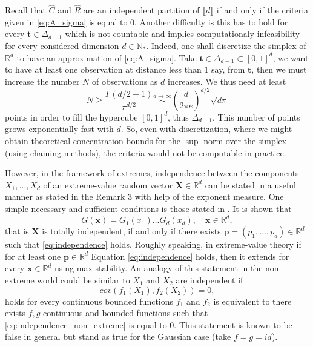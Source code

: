 \documentclass[11pt]{article}
\theoremstyle{definition}
\begin{document}
	Recall that $\hat{C}$ and $\hat{R}$ are an independent partition of $\llbracket d \rrbracket$ if and only if the criteria given in \eqref{eq:A_sigma} is equal to $0$. Another difficulty is this has to hold for every $\textbf{t} \in \Delta_{d-1}$ which is not countable and implies computationaly infeasibility for every considered dimension $d \in \mathbb{N}_*$. Indeed, one shall discretize the simplex of $\mathbb{R}^d$ to have an approximation of \eqref{eq:A_sigma}. Take $\textbf{t} \in \Delta_{d-1} \subset [0,1]^d$, we want to have at least one observation at distance less than $1$ say, from $\textbf{t}$, then we must increase the number $N$ of observations as $d$ increases. We thus need at least
	\begin{equation*}
	N \geq \frac{\Gamma(d/2 + 1)}{\pi^{d/2}} \overset{d \rightarrow \infty}{\sim} \left( \frac{d}{2 \pi e} \right)^{d/2} \sqrt{d \pi}
	\end{equation*}
	points in order to fill the hypercube $[0,1]^d$, thus $\Delta_{d-1}$. This number of points grows exponentially fast with $d$. So, even with discretization, where we might obtain theoretical concentration bounds for the $\sup$-norm over the simplex (using chaining methods), the criteria would not be computable in practice.
	
	However, in the framework of extremes, independence between the components $X_1, \dots, X_d$ of an extreme-value random vector $\textbf{X} \in \mathbb{R}^d$ can be stated in a useful manner as stated in the Remark 3 with help of the exponent measure. One simple necessary and sufficient conditions is those stated in \cite{Takahashi1987SomePO, takahashi1994asymptotic}. It is shown that
	\begin{equation}
	\label{eq:independence}
		G(\textbf{x}) = G_1(x_1) \dots G_d(x_d), \quad \textbf{x} \in \mathbb{R}^d,
	\end{equation}
	 that is $\textbf{X}$ is totally independent, if and only if there exists $\textbf{p} = (p_1, \dots, p_d) \in \mathbb{R}^d$ such that \eqref{eq:independence} holds. Roughly speaking, in extreme-value theory if for at least one $\textbf{p} \in \mathbb{R}^d$ Equation \eqref{eq:independence} holds, then it extends for every $\textbf{x} \in \mathbb{R}^d$ using max-stability. An analogy of this statement in the non-extreme world could be similar to $X_1$ and $X_2$ are independent if
	 \begin{equation}
	 	\label{eq:independence_non_extreme}
	 	cov(f_1(X_1), f_2(X_2)) = 0,
	 \end{equation}
	 holds for every continuous bounded functions $f_1$ and $f_2$ is equivalent to there exists $f,g$ continuous and bounded functions such that \eqref{eq:independence_non_extreme} is equal to $0$. This statement is known to be false in general but stand as true for the Gaussian case (take $f = g = id$). 
	 
\end{document}
